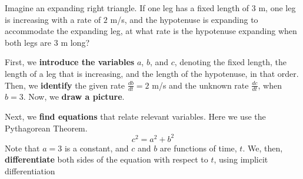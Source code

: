 \documentclass{ximera}
\begin{document}
\begin{example}
  Imagine an expanding right triangle. If one leg has a fixed length
  of $3$ m, one leg is increasing with a rate of $2$ m/s, and the
  hypotenuse is expanding to accommodate the expanding leg, at what
  rate is the hypotenuse expanding when both legs are $3$ m long?
  \begin{explanation}
 First, we \textbf{introduce the variables}  $a$, $b$, and $c$, denoting the fixed length, the length of a leg that is increasing, 
 and  the length of the hypotenuse, in that order. Then, we \textbf{identify} the given rate $\frac{db}{dt}=2$ m/s and the unknown rate $\frac{dc}{dt}$, when $b=3$.
   Now, we \textbf{draw a picture}.
    \begin{image}
    \end{image}

    Next, we  \textbf{find equations} that relate relevant
    variables. Here we use the Pythagorean Theorem.
    \[
    c^2 = a^2 + b^2
    \]
   Note that $a=3$ is a constant, and $c$ and $b$ are functions of time, $t$.
    We, then, \textbf{differentiate} both sides of the equation with respect to $t$,  using  implicit differentiation
  

\end{explanation}
\end{example}
\end{document}
